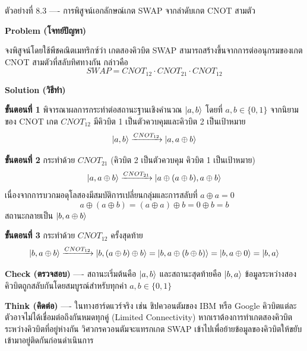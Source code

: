 \begin{psctbox}{ตัวอย่างที่ 8.3 ---- การพิสูจน์เอกลักษณ์เกต SWAP จากลำดับเกต CNOT สามตัว}

\textbf{Problem (โจทย์ปัญหา)}

จงพิสูจน์โดยใช้พีชคณิตเมทริกซ์ว่า เกตสองคิวบิต SWAP สามารถสร้างขึ้นจากการต่ออนุกรมของเกต CNOT สามตัวที่สลับทิศทางกัน กล่าวคือ
\begin{equation*}
SWAP = CNOT_{12} \cdot CNOT_{21} \cdot CNOT_{12}
\end{equation*}

\textbf{Solution (วิธีทำ)}

\textbf{ขั้นตอนที่ 1} พิจารณาผลการกระทำต่อสถานะฐานเชิงคำนวณ $\ket{a, b}$ โดยที่ $a, b \in \{0, 1\}$
จากนิยามของ CNOT เกต $CNOT_{12}$ มีคิวบิต 1 เป็นตัวควบคุมและคิวบิต 2 เป็นเป้าหมาย
\begin{equation*}
\ket{a, b} \xrightarrow{CNOT_{12}} \ket{a, a \oplus b}
\end{equation*}

\textbf{ขั้นตอนที่ 2} กระทำด้วย $CNOT_{21}$ (คิวบิต 2 เป็นตัวควบคุม คิวบิต 1 เป็นเป้าหมาย)
\begin{equation*}
\ket{a, a \oplus b} \xrightarrow{CNOT_{21}} \ket{a \oplus (a \oplus b), a \oplus b}
\end{equation*}
เนื่องจากการบวกมอดุโลสองมีสมบัติการเปลี่ยนกลุ่มและการสลับที่ $a \oplus a = 0$
\begin{equation*}
a \oplus (a \oplus b) = (a \oplus a) \oplus b = 0 \oplus b = b
\end{equation*}
สถานะกลายเป็น $\ket{b, a \oplus b}$

\textbf{ขั้นตอนที่ 3} กระทำด้วย $CNOT_{12}$ ครั้งสุดท้าย
\begin{equation*}
\ket{b, a \oplus b} \xrightarrow{CNOT_{12}} \ket{b, (a \oplus b) \oplus b} = \ket{b, a \oplus (b \oplus b)} = \ket{b, a \oplus 0} = \ket{b, a}
\end{equation*}

\textbf{Check (ตรวจสอบ)} ---- สถานะเริ่มต้นคือ $\ket{a, b}$ และสถานะสุดท้ายคือ $\ket{b, a}$ ข้อมูลระหว่างสองคิวบิตถูกสลับกันโดยสมบูรณ์สำหรับทุกค่า $a, b \in \{0, 1\}$

\textbf{Think (คิดต่อ)} ---- ในทางฮาร์ดแวร์จริง เช่น ชิปควอนตัมของ IBM หรือ Google คิวบิตแต่ละตัวอาจไม่ได้เชื่อมต่อถึงกันหมดทุกคู่ (Limited Connectivity) หากเราต้องการทำเกตสองคิวบิตระหว่างคิวบิตที่อยู่ห่างกัน วิศวกรควอนตัมจะแทรกเกต SWAP เข้าไปเพื่อย้ายข้อมูลของคิวบิตให้ขยับเข้ามาอยู่ติดกันก่อนดำเนินการ
\end{psctbox}

